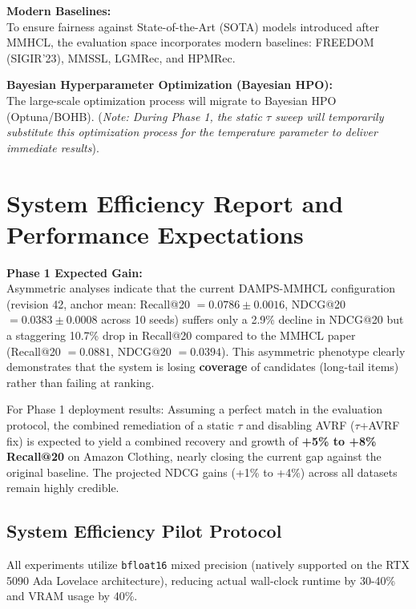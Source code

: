 \documentclass[12pt, a4paper]{article}
\begin{document}
\noindent \textbf{Modern Baselines:} \\
To ensure fairness against State-of-the-Art (SOTA) models introduced after MMHCL, the evaluation space incorporates modern baselines: FREEDOM (SIGIR'23), MMSSL, LGMRec, and HPMRec.

\noindent \textbf{Bayesian Hyperparameter Optimization (Bayesian HPO):} \\
The large-scale optimization process will migrate to Bayesian HPO (Optuna/BOHB). (\textit{Note: During Phase 1, the static $\tau$ sweep will temporarily substitute this optimization process for the temperature parameter to deliver immediate results}).

\section{System Efficiency Report and Performance Expectations}

\noindent \textbf{Phase 1 Expected Gain:} \\
Asymmetric analyses indicate that the current DAMPS-MMHCL configuration (revision 42, anchor mean: Recall@20 $= 0.0786 \pm 0.0016$, NDCG@20 $= 0.0383 \pm 0.0008$ across 10 seeds) suffers only a 2.9\% decline in NDCG@20 but a staggering 10.7\% drop in Recall@20 compared to the MMHCL paper (Recall@20 $= 0.0881$, NDCG@20 $= 0.0394$). This asymmetric phenotype clearly demonstrates that the system is losing \textbf{coverage} of candidates (long-tail items) rather than failing at ranking.

For Phase 1 deployment results: Assuming a perfect match in the evaluation protocol, the combined remediation of a static $\tau$ and disabling AVRF ($\tau$+AVRF fix) is expected to yield a combined recovery and growth of \textbf{+5\% to +8\% Recall@20} on Amazon Clothing, nearly closing the current gap against the original baseline. The projected NDCG gains (+1\% to +4\%) across all datasets remain highly credible.

\subsection{System Efficiency Pilot Protocol}
All experiments utilize \texttt{bfloat16} mixed precision (natively supported on the RTX 5090 Ada Lovelace architecture), reducing actual wall-clock runtime by 30-40\% and VRAM usage by 40\%.
\end{document}
